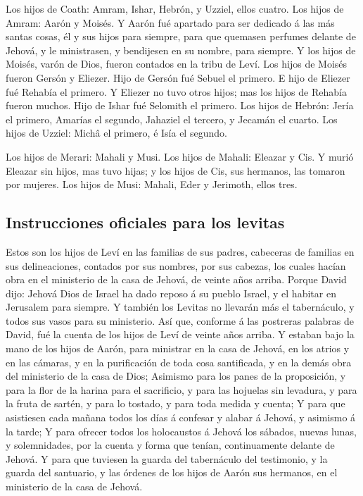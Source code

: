  Los hijos de Coath: Amram, Ishar, Hebrón, y Uzziel,
ellos cuatro.  Los hijos de Amram: Aarón y Moisés. Y
Aarón fué apartado para ser dedicado á las más santas cosas, él y sus
hijos para siempre, para que quemasen perfumes delante de Jehová, y le
ministrasen, y bendijesen en su nombre, para siempre.  Y
los hijos de Moisés, varón de Dios, fueron contados en la tribu de Leví.
 Los hijos de Moisés fueron Gersón y Eliezer.
 Hijo de Gersón fué Sebuel el primero.  E
hijo de Eliezer fué Rehabía el primero. Y Eliezer no tuvo otros hijos;
mas los hijos de Rehabía fueron muchos.  Hijo de Ishar
fué Selomith el primero.  Los hijos de Hebrón: Jería el
primero, Amarías el segundo, Jahaziel el tercero, y Jecamán el cuarto.
 Los hijos de Uzziel: Michâ el primero, é Isía el
segundo.

 Los hijos de Merari: Mahali y Musi. Los hijos de Mahali:
Eleazar y Cis.  Y murió Eleazar sin hijos, mas tuvo
hijas; y los hijos de Cis, sus hermanos, las tomaron por mujeres.
 Los hijos de Musi: Mahali, Eder y Jerimoth, ellos tres.

\hypertarget{instrucciones-oficiales-para-los-levitas}{%
\subsection{Instrucciones oficiales para los
levitas}\label{instrucciones-oficiales-para-los-levitas}}

 Estos son los hijos de Leví en las familias de sus
padres, cabeceras de familias en sus delineaciones, contados por sus
nombres, por sus cabezas, los cuales hacían obra en el ministerio de la
casa de Jehová, de veinte años arriba.  Porque David
dijo: Jehová Dios de Israel ha dado reposo á su pueblo Israel, y el
habitar en Jerusalem para siempre.  Y también los Levitas
no llevarán más el tabernáculo, y todos sus vasos para su ministerio.
 Así que, conforme á las postreras palabras de David, fué
la cuenta de los hijos de Leví de veinte años arriba.  Y
estaban bajo la mano de los hijos de Aarón, para ministrar en la casa de
Jehová, en los atrios y en las cámaras, y en la purificación de toda
cosa santificada, y en la demás obra del ministerio de la casa de Dios;
 Asimismo para los panes de la proposición, y para la
flor de la harina para el sacrificio, y para las hojuelas sin levadura,
y para la fruta de sartén, y para lo tostado, y para toda medida y
cuenta;  Y para que asistiesen cada mañana todos los días
á confesar y alabar á Jehová, y asimismo á la tarde;  Y
para ofrecer todos los holocaustos á Jehová los sábados, nuevas lunas, y
solemnidades, por la cuenta y forma que tenían, continuamente delante de
Jehová.  Y para que tuviesen la guarda del tabernáculo
del testimonio, y la guarda del santuario, y las órdenes de los hijos de
Aarón sus hermanos, en el ministerio de la casa de Jehová.

